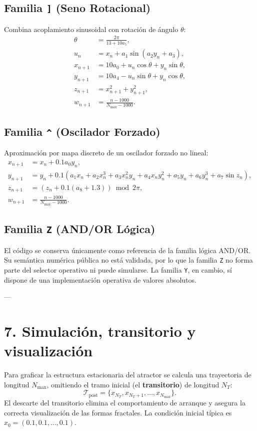 \documentclass[11pt]{article}
\newcommand{\code}[1]{\texttt{#1}}
\begin{document}
\subsection{Familia \code{]} (Seno Rotacional)}
Combina acoplamiento sinusoidal con rotación de ángulo $\theta$:
\[
\begin{aligned}
\theta &= \frac{2\pi}{13 + 10a_5}, \\
u_n &= x_n + a_1 \sin(a_2 y_n + a_3), \\
x_{n+1} &= 10a_0 + u_n \cos\theta + y_n \sin\theta, \\
y_{n+1} &= 10a_4 - u_n \sin\theta + y_n \cos\theta, \\
z_{n+1} &= x_{n+1}^2 + y_{n+1}^2, \\
w_{n+1} &= \frac{n - 1000}{N_{\max} - 1000}.
\end{aligned}
\]

\subsection{Familia \code{\^{}} (Oscilador Forzado)}
Aproximación por mapa discreto de un oscilador forzado no lineal:
\[
\begin{aligned}
x_{n+1} &= x_n + 0.1 a_0 y_n, \\
y_{n+1} &= y_n + 0.1 (a_1 x_n + a_2 x_n^3 + a_3 x_n^2 y_n + a_4 x_n y_n^2 + a_5 y_n + a_6 y_n^3 + a_7 \sin z_n), \\
z_{n+1} &= (z_n + 0.1(a_8 + 1.3)) \bmod 2\pi, \\
w_{n+1} &= \frac{n - 1000}{N_{\max} - 1000}.
\end{aligned}
\]

\subsection{Familia \code{Z} (AND/OR Lógica)}
El código se conserva únicamente como referencia de la familia lógica AND/OR.
Su semántica numérica pública no está validada, por lo que la familia \code{Z}
no forma parte del selector operativo ni puede simularse. La familia \code{Y},
en cambio, sí dispone de una implementación operativa de valores absolutos.

---

\section{7. Simulación, transitorio y visualización}

Para graficar la estructura estacionaria del atractor se calcula una trayectoria de longitud $N_{\max}$, omitiendo el tramo inicial (el \textbf{transitorio}) de longitud $N_T$:
\[
\mathcal{T}_{\text{post}} = \{x_{N_T}, x_{N_T+1}, \ldots, x_{N_{\max}}\}.
\]
El descarte del transitorio elimina el comportamiento de arranque y asegura la correcta visualización de las formas fractales. La condición inicial típica es $x_0 = (0.1, 0.1, \ldots, 0.1)$.
\end{document}
